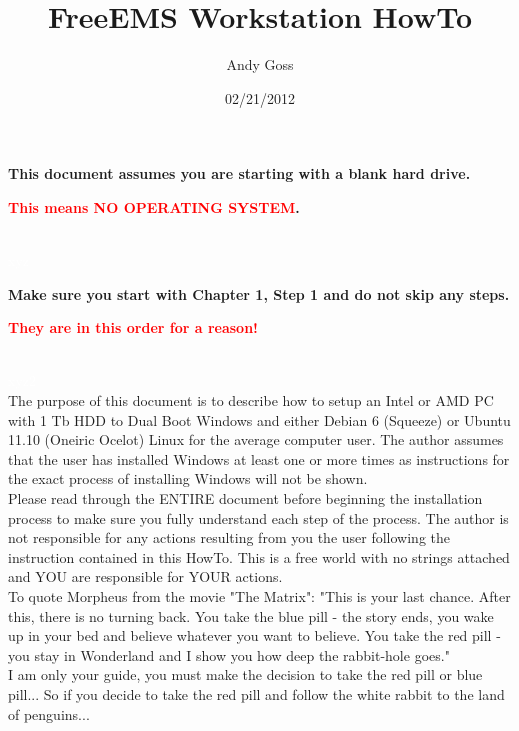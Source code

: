 \documentclass[12pt,notitlepage,onecolumn,oneside,openany]{memoir}
\title{\textsf{FreeEMS Workstation HowTo}}
\author{\textsf{Andy Goss}}
\date{\textsf{02/21/2012}}
\begin{document}
\maketitle

\centerline{\textbf{\textsf{This document assumes you are starting with a blank hard drive.}}} 
\centerline{\textbf{\textsf{\textcolor{red}{This means NO OPERATING SYSTEM}.}}}
\\
\textcolor{white}{xyz}
\\
\centerline{\textbf{\textsf{Make sure you start with Chapter 1, Step 1 and do not skip any steps.}}}
\centerline{\textbf{\textsf{\textcolor{red}{They are in this order for a reason!}}}}
\\
\textcolor{white}{xyz2}
\\
\textsf{The purpose of this document is to describe how to setup an Intel or AMD PC with 1 Tb HDD to Dual Boot Windows and either Debian 6 (Squeeze) or Ubuntu 11.10 (Oneiric Ocelot) Linux for the average computer user.  The author assumes that the user has installed Windows at least one or more times as instructions for the exact process of installing Windows will not be shown.} \newline
\\
\textsf{Please read through the ENTIRE document before beginning the installation process to make sure you fully understand each step of the process.  The author is not responsible for any actions resulting from you the user following the instruction contained in this HowTo. This is a free world with no strings attached and YOU are responsible for YOUR actions.} \newline
\\
\textsf{To quote Morpheus from the movie "The Matrix": "This is your last chance. After this, there is no turning back. You take the blue pill - the story ends, you wake up in your bed and believe whatever you want to believe. You take the red pill - you stay in Wonderland and I show you how deep the rabbit-hole goes."} \newline
\\
\textsf{I am only your guide, you must make the decision to take the red pill or blue pill...} \newline
\textsf{So if you decide to take the red pill and follow the white rabbit to the land of penguins...} \newline
\end{document}
